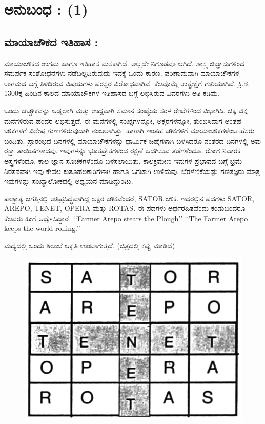 
\chapter*{ಅನುಬಂಧ : (1)}

\section*{ಮಾಯಾಚೌಕದ ಇತಿಹಾಸ :}

ಮಾಯಾಚೌಕದ ಉಗಮ ಹಾಗೂ ಇತಿಹಾಸ ಮಸಕಾಗಿದೆ. ಅಲ್ಲದೇ ನಿಗೂಢವೂ ಆಗಿದೆ. ಶಾಸ್ತ್ರ ಜಿಜ್ಞಾಸುಗಳಿಂದ ಸಮರ್ಪಕ ಸಂಶೋಧನೆಗಳು ನಡೆದಿಲ್ಲದಿರುವುದು ಇದಕ್ಕೆ ಒಂದು ಕಾರಣ. ಪರಿಣಾಮವಾಗಿ ಮಾಯಾಚೌಕಗಳ ಉಗಮದ ಬಗ್ಗೆ ತಿಳಿದಿರುವ ವಿಷಯಗಳು ಪರಸ್ಪರ ವಿರೋಧವಾಗಿವೆ. ಕೆಲವೊಮ್ಮೆ ಉತ್ಪ್ರೇಕ್ಷೆಗೆ ಗುರಿಯಾಗಿವೆ. ಕ್ರಿ.ಶ. 1300ಕ್ಕೆ ಹಿಂದಿನ ಕಾಲದ ಮಾಯಾಚೌಕಗಳ ಇತಿಹಾಸದ ಬಗ್ಗೆ ಲಭಿಸಿರುವ ವಿವರಗಳು ಅತಿ ಕಡಿಮೆ.

ಒಂದು ಚಚ್ಚೌಕವನ್ನು ಅಡ್ಡಲಾಗಿ ಮತ್ತು ಉದ್ದವಾಗಿ ಸಮಾನ ಸಂಖ್ಯೆಯ ಸರಳ ರೇಖೆಗಳಿಂದ ವಿಭಾಗಿಸಿ. ಚಿಕ್ಕ ಚಿಕ್ಕ ಮನೆಗಳಿರುವ ಹಂದರ ಲಭಿಸುತ್ತದೆ. ಈ ಮನೆಗಳಲ್ಲಿ ಸಂಖ್ಯೆಗಳನ್ನೋ, ಅಕ್ಷರಗಳನ್ನೋ, ತುಂಬಿಸಿದಾಗ ಅಂತಹ ಚೌಕಗಳಿಗೆ ವಿಶೇಷ ಗುಣಗಳಿರುವುದಾಗಿ ನಂಬಲಾಗಿತ್ತು. ಹಾಗಾಗಿ ಇಂತಹ ಚೌಕಗಳಿಗೆ ಮಾಯಾಚೌಕಗಳೆಂಬ ಹೆಸರು ಬಂದಿತು. ಪ್ರಾರಂಭದ ದಿನಗಳಲ್ಲಿ ಮಾಯಾಚೌಕಗಳನ್ನು ಧಾರ್ಮಿಕ ಚಿಹ್ನೆಗಳಾಗಿ ಬಳಸಿದರೂ ನಂತರದ ದಿನಗಳಲ್ಲಿ ಅವು ರಕ್ಷಾ ತಾಯಿತಗಳಾದವು. ಇವುಗಳನ್ನು ಭೂತಪ್ರೇತಗಳಿಂದ ರಕ್ಷಣೆ ಒದಗಿಸುವ ತಡೆಗಳೆಂದೂ, ರೋಗ ನಿವಾರಕ ಅಸ್ತ್ರಗಳೆಂದೂ, ಕಾಲ ಜ್ಞಾನ ಸೂಚಕಗಳೆಂದೂ ಬಳಸಲಾಯಿತು. ಕಾಲಕ್ರಮೇಣ ಇವುಗಳ ಪ್ರಭಾವದ ಬಗ್ಗೆ ಭ್ರಮೆ ನಿರಸನವಾಗಿ ಇವು ಕೇವಲ ಕುತೂಹಲಕಾರಿಗಳಾಗಿ ಹಾಗೂ ಒಗಟಾಗಿ ಉಳಿದುವು. ಬೆರಳೆಣಿಕೆಯಷ್ಟು ಗಣಿತಜ್ಞರು ಮಾತ್ರ ಇವುಗಳನ್ನು ಸಂಖ್ಯಾಲೋಕದಲ್ಲಿ ಅಧ್ಯಯನ ಮಾಡಿದ್ದುಂಟು.

ಪಾಶ್ಚಾತ್ಯ ಜಗತ್ತಿನಲ್ಲಿ ಅತಿಪ್ರಸಿದ್ಧವಾಗಿದ್ದ ಅಕ್ಷರ ಚೌಕವೆಂದರೆ, SATOR ಚೌಕ. ಇದರಲ್ಲಿನ ಪದಗಳು SATOR, AREPO, TENET, OPERA ಮತ್ತು ROTAS. ಈ ಪದಗಳು ಅರ್ಥರಹಿತವೆಂದು ಕಂಡುಬಂದರೂ ಕೆಲವರು ಹೀಗೆ ಅರ್ಥೈಸಿದ್ದಾರೆ. ‘‘Farmer Arepo stears the Plough’’ ‘‘The Farmer Arepo keeps the world rolling.’’

ಮಧ್ಯದಲ್ಲಿ ಒಂದು ಶಿಲುಬೆ ಆಕೃತಿ ಉಂಟಾಗುತ್ತದೆ. (ಚಿತ್ರದಲ್ಲಿ ಕಪ್ಪು ಮಾಡಿದೆ)
\begin{figure}[H]
\includegraphics{src/figures/chap9/fig9.1.jpg}
\end{figure}

